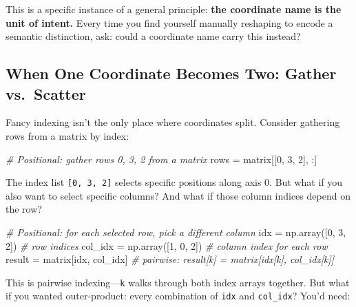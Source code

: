 \documentclass[11pt,titlepage]{article}
\newenvironment{Shaded}{}{}
\newcommand{\CommentTok}[1]{\textcolor[rgb]{0.38,0.63,0.69}{\textit{#1}}}
\newcommand{\DecValTok}[1]{\textcolor[rgb]{0.25,0.63,0.44}{#1}}
\newcommand{\NormalTok}[1]{#1}
\newcommand{\OperatorTok}[1]{\textcolor[rgb]{0.40,0.40,0.40}{#1}}
\begin{document}
This is a specific instance of a general principle: \textbf{the
coordinate name is the unit of intent.} Every time you find yourself
manually reshaping to encode a semantic distinction, ask: could a
coordinate name carry this instead?

\vspace{2em}

\hypertarget{when-one-coordinate-becomes-two-gather-vs.scatter}{%
\subsection{When One Coordinate Becomes Two: Gather
vs.~Scatter}\label{when-one-coordinate-becomes-two-gather-vs.scatter}}

Fancy indexing isn't the only place where coordinates split. Consider
gathering rows from a matrix by index:

\begin{Shaded}
\begin{Highlighting}[]
\CommentTok{# Positional: gather rows 0, 3, 2 from a matrix}
\NormalTok{rows }\OperatorTok{=}\NormalTok{ matrix[[}\DecValTok{0}\NormalTok{, }\DecValTok{3}\NormalTok{, }\DecValTok{2}\NormalTok{], :]}
\end{Highlighting}
\end{Shaded}

The index list \texttt{{[}0,\ 3,\ 2{]}} selects specific positions along
axis 0. But what if you also want to select specific columns? And what
if those column indices depend on the row?

\begin{Shaded}
\begin{Highlighting}[]
\CommentTok{# Positional: for each selected row, pick a different column}
\NormalTok{idx }\OperatorTok{=}\NormalTok{ np.array([}\DecValTok{0}\NormalTok{, }\DecValTok{3}\NormalTok{, }\DecValTok{2}\NormalTok{])   }\CommentTok{# row indices}
\NormalTok{col_idx }\OperatorTok{=}\NormalTok{ np.array([}\DecValTok{1}\NormalTok{, }\DecValTok{0}\NormalTok{, }\DecValTok{2}\NormalTok{])  }\CommentTok{# column index for each row}
\NormalTok{result }\OperatorTok{=}\NormalTok{ matrix[idx, col_idx]  }\CommentTok{# pairwise: result[k] = matrix[idx[k], col_idx[k]]}
\end{Highlighting}
\end{Shaded}

This is pairwise indexing---\texttt{k} walks through both index arrays
together. But what if you wanted outer-product: every combination of
\texttt{idx} and \texttt{col\_idx}? You'd need:
\end{document}
